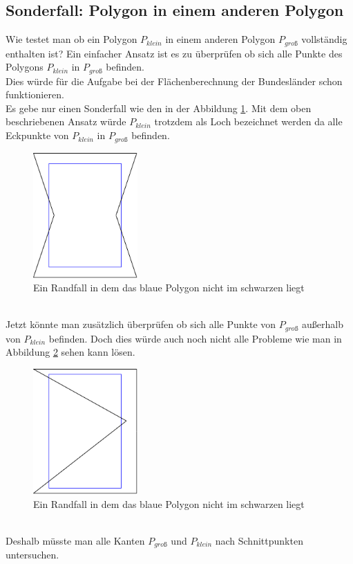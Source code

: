 \documentclass[conference]{IEEEtran}
\begin{document}
	\subsection{Sonderfall: Polygon in einem anderen Polygon}
	Wie testet man ob ein Polygon $P_{klein}$ in einem anderen Polygon $P_{groß}$ vollständig enthalten ist?
	Ein einfacher Ansatz ist es zu überprüfen ob sich alle Punkte des Polygons $P_{klein}$ in $P_{groß}$ befinden.\\
	Dies würde für die Aufgabe bei der Flächenberechnung der Bundesländer schon funktionieren.\\
	Es gebe nur einen Sonderfall wie den in der Abbildung \ref{polyInPoly}. Mit dem oben beschriebenen Ansatz würde $P_{klein}$ trotzdem als Loch bezeichnet werden da alle Eckpunkte von $P_{klein}$ in $P_{groß}$ befinden.
	\begin{figure}[h]
		\begin{center}
			\includegraphics[width=4cm]{PolyInPoly.png}
			\caption{Ein Randfall in dem das blaue Polygon nicht im schwarzen liegt}
			\label{polyInPoly}
		\end{center}
	\end{figure}\\
	Jetzt könnte man zusätzlich überprüfen ob sich alle Punkte von $P_{groß}$ außerhalb von $P_{klein}$ befinden. Doch dies würde auch noch nicht alle Probleme wie man in Abbildung \ref{polyInPoly2} sehen kann lösen.
	\begin{figure}[h]
		\begin{center}
			\includegraphics[width=4cm]{PolyInPoly2.png}
			\caption{Ein Randfall in dem das blaue Polygon nicht im schwarzen liegt}
			\label{polyInPoly2}
		\end{center}
	\end{figure}\\
	Deshalb müsste man alle Kanten $P_{groß}$ und $P_{klein}$ nach Schnittpunkten untersuchen.
	
\end{document}

